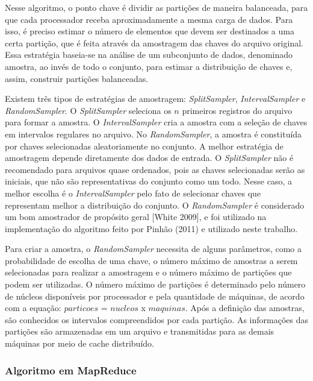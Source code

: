 Nesse algoritmo, o ponto chave é dividir as partições de maneira balanceada, para que cada processador receba aproximadamente a mesma carga de dados. Para isso, é preciso estimar o número de elementos que devem ser destinados a uma certa partição, que é feita através da amostragem das chaves do arquivo original. Essa estratégia baseia-se na análise de um subconjunto de dados, denominado amostra, ao invés de todo o conjunto, para estimar a distribuição de chaves e, assim, construir partições balanceadas.

Existem três tipos de estratégias de amostragem: \textit{SplitSampler}, \textit{IntervalSampler} e \textit{RandomSampler}. O \textit{SplitSampler} seleciona os $n$ primeiros registros do arquivo para formar a amostra. O \textit{IntervalSampler} cria a amostra com a seleção de chaves em intervalos regulares no arquivo. No \textit{RandomSampler}, a amostra é constituída por chaves selecionadas aleatoriamente no conjunto. A melhor estratégia de amostragem depende diretamente dos dados de entrada. O \textit{SplitSampler} não é recomendado para arquivos quase ordenados, pois as chaves selecionadas serão as iniciais, que não são representativas do conjunto como um todo. Nesse caso, a melhor escolha é o \textit{IntervalSampler} pelo fato de selecionar chaves que representam melhor a distribuição do conjunto. O \textit{RandomSampler} é considerado um bom amostrador de propósito geral [White 2009], e foi utilizado na implementação do algoritmo feito por Pinhão (2011) e utilizado neste trabalho.

Para criar a amostra, o \textit{RandomSampler} necessita de alguns parâmetros, como a probabilidade de escolha de uma chave, o número máximo de amostras a serem selecionadas para realizar a amostragem e o número máximo de partições que podem ser utilizadas.
O número máximo de partições é determinado pelo número de núcleos disponíveis por processador e pela quantidade de máquinas, de acordo com a equação: $particoes$ = $nucleos$ x $maquinas$.
Após a definição das amostras, são conhecidos os intervalos compreendidos por cada partição. As informações das partições são armazenadas em um arquivo e transmitidas para as demais máquinas por meio de cache distribuído.


\subsubsection{Algoritmo em MapReduce}

